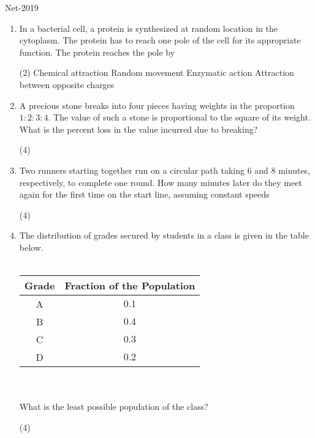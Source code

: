 \begin{abox}
	Net-2019 
\end{abox}
\begin{enumerate}
	\item In a bacterial cell, a protein is synthesized at random location in the cytoplasm. The protein has to reach one pole of the cell for its appropriate function. The protein reaches the pole by
	 \begin{tasks}(2)
		\task[\textbf{a.}]Chemical attraction
		\task[\textbf{b.}]Random movement
		\task[\textbf{c.}]Enzymatic action
		\task[\textbf{d.}] Attraction between opposite charges
	\end{tasks}
	\item A precious stone breaks into four pieces having weights in the proportion $1: 2: 3: 4$. The value of such a stone is proportional to the square of its weight. What is the percent loss in the value incurred due to breaking?
	 \begin{tasks}(4)
	\end{tasks}
	\item Two runners starting together run on a circular path taking 6 and 8 minutes, respectively, to complete one round. How many minutes later do they meet again for the first time on the start line, assuming constant speeds
	 \begin{tasks}(4)
	\end{tasks}
	\item 	 The distribution of grades secured by students in a class is given in the table below.\\\\
	\begin{tabular}{|c|c|}
		\hline Grade & Fraction of the Population \\
		\hline A & $0.1$ \\
		\hline B & $0.4$ \\
		\hline C & $0.3$ \\
		\hline D & $0.2$ \\
		\hline
	\end{tabular}\\\\
	What is the least possible population of the class?
	 \begin{tasks}(4)

\end{tasks}
\end{enumerate}
